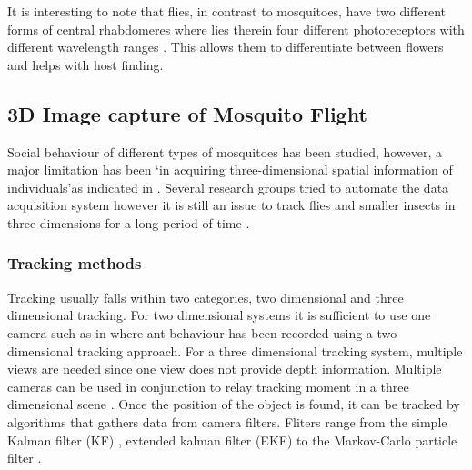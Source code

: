 It is interesting to note that flies, in contrast to mosquitoes, have two different forms of central rhabdomeres where lies therein four different photoreceptors with different wavelength ranges \cite{lunau2014visual}. This allows them to differentiate between flowers and helps with host finding. 


\subsection{3D Image capture of Mosquito Flight}

Social behaviour of different types of mosquitoes has been studied, however, a major limitation has been \lq in acquiring three-dimensional spatial information of individuals\rq as indicated in \cite{ardekani2012three}. Several research groups tried to automate the data acquisition system however it is still an issue to track flies and smaller insects in three dimensions for a long period of time \cite{grover2008fly, kohlhoff2011ifly, straw2010multi}. 

\subsubsection{Tracking methods}
Tracking usually falls within two categories, two dimensional and three dimensional tracking. For two dimensional systems it is sufficient to use one camera such as in \cite{khan2005mcmc} where ant behaviour has been recorded using a two dimensional tracking approach. For a three dimensional tracking system, multiple views are needed since one view does not provide depth information. Multiple cameras can be used in conjunction to relay tracking moment in a three dimensional scene \cite{hartley2000multiple}. Once the position of the object is found, it can be tracked by algorithms that gathers data from camera filters. Fliters range from the simple Kalman filter (KF) \cite{pistori2010mice}, extended kalman filter (EKF)\cite{grover2008fly, branson2009high} to the Markov-Carlo particle filter \cite{khan2005mcmc}.

